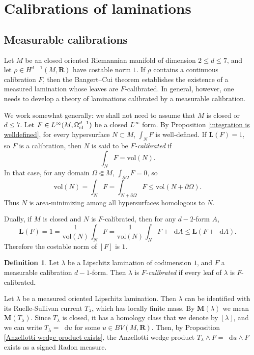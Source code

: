 \documentclass[reqno,11pt]{amsart}
\newcommand{\RR}{\mathbf{R}}
\newcommand*\dif{\mathop{}\!\mathrm{d}}
\newcommand{\vol}{\mathrm{vol}}
\newcommand{\Mass}{\mathbf M}
\newcommand{\Comass}{\mathbf L}
\newcommand{\dfn}[1]{\emph{#1}\index{#1}}
\theoremstyle{definition}
\newtheorem{definition}[theorem]{Definition}
\numberwithin{equation}{section}
\begin{document}
\section{Calibrations of laminations}\label{comass sec}
\subsection{Measurable calibrations}\label{L infinity calibrations}
Let $M$ be an closed oriented Riemannian manifold of dimension $2 \leq d \leq 7$, and let $\rho \in H^{d - 1}(M, \RR)$ have costable norm $1$.
If $\rho$ contains a continuous calibration $F$, then the Bangert--Cui theorem \cite{bangert_cui_2017} establishes the existence of a measured lamination whose leaves are $F$-calibrated.
In general, however, one needs to develop a theory of laminations calibrated by a measurable calibration.

We work somewhat generally: we shall not need to assume that $M$ is closed or $d \leq 7$.
Let $F \in L^\infty(M, \Omega^{d - 1}_{\rm cl})$ be a closed $L^\infty$ form.
By Proposition \ref{integration is welldefined}, for every hypersurface $N \subset M$, $\int_N F$ is well-defined.
If $\Comass(F) = 1$, so $F$ is a calibration, then $N$ is said to be \dfn{$F$-calibrated} if 
$$\int_N F = \vol(N).$$
In that case, for any domain $\Omega \Subset M$, $\int_{\partial \Omega} F = 0$, so
$$\vol(N) = \int_N F = \int_{N + \partial \Omega} F \leq \vol(N + \partial \Omega).$$
Thus $N$ is area-minimizing among all hypersurfaces homologous to $N$.

Dually, if $M$ is closed and $N$ is $F$-calibrated, then for any $d - 2$-form $A$, 
$$\Comass(F) = 1 = \frac{1}{\vol(N)} \int_N F = \frac{1}{\vol(N)} \int_N F + \dif A \leq \Comass(F + \dif A).$$
Therefore the costable norm of $[F]$ is $1$.

\begin{definition}
Let $\lambda$ be a Lipschitz lamination of codimension $1$, and $F$ a measurable calibration $d - 1$-form.
Then $\lambda$ is \dfn{$F$-calibrated} if every leaf of $\lambda$ is $F$-calibrated.
\end{definition}

Let $\lambda$ be a measured oriented Lipschitz lamination.
Then $\lambda$ can be identified with its Ruelle-Sullivan current $T_\lambda$, which has locally finite mass.
By $\Mass(\lambda)$ we mean $\Mass(T_\lambda)$.
Since $T_\lambda$ is closed, it has a homology class that we denote by $[\lambda]$, and we can write $T_\lambda = \dif u$ for some $u \in BV(M, \RR)$.
Then, by Proposition \ref{Anzellotti wedge product exists}, the Anzellotti wedge product $T_\lambda \wedge F = \dif u \wedge F$ exists as a signed Radon measure.
\end{document}
